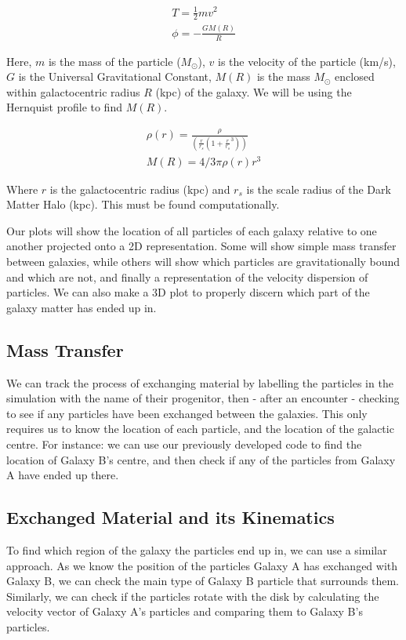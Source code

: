 \documentclass[linenumbers, ]{aastex631}
\begin{document}
\begin{gather}
T = \frac{1}{2} mv^2 \\
\phi = -\frac{GM(R)}{R}
\end{gather}

Here, $m$ is the mass of the particle ($M_\odot$), $v$ is the velocity of the particle (km/s), $G$ is the Universal Gravitational Constant, $M(R)$ is the mass $M_\odot$ enclosed within galactocentric radius $R$ (kpc) of the galaxy. We will be using the Hernquist profile \citep{1990ApJ...356..359H} to find $M(R)$.

\begin{gather}
    \rho(r) = \frac{\rho}{(\frac{r}{r_s}(1+\frac{r}{r_s}^3))}\\
    M(R) = 4/3\pi\rho(r)r^3
\end{gather}

Where $r$ is the galactocentric radius (kpc) and $r_s$ is the scale radius of the Dark Matter Halo (kpc). This must be found computationally.

Our plots will show the location of all particles of each galaxy relative to one another projected onto a 2D representation. Some will show simple mass transfer between galaxies, while others will show which particles are gravitationally bound and which are not, and finally a representation of the velocity dispersion of particles. We can also make a 3D plot to properly discern which part of the galaxy matter has ended up in.

\subsection{Mass Transfer}

We can track the process of exchanging material by labelling the particles in the simulation with the name of their progenitor, then - after an encounter - checking to see if any particles have been exchanged between the galaxies. This only requires us to know the location of each particle, and the location of the galactic centre. For instance: we can use our previously developed code to find the location of Galaxy B's centre, and then check if any of the particles from Galaxy A have ended up there.

\subsection{Exchanged Material and its Kinematics}

To find which region of the galaxy the particles end up in, we can use a similar approach. As we know the position of the particles Galaxy A has exchanged with Galaxy B, we can check the main type of Galaxy B particle that surrounds them. Similarly, we can check if the particles rotate with the disk by calculating the velocity vector of Galaxy A's particles and comparing them to Galaxy B's particles. 
\end{document}
